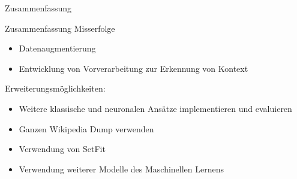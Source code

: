 \documentclass[aspectratio=169]{beamer} %
\begin{document}
\begin{frame}{Zusammenfassung}
    \begin{block}{Zusammenfassung}
        Misserfolge
        \begin{itemize}
            \item Datenaugmentierung
            \item Entwicklung von Vorverarbeitung zur Erkennung von Kontext
        \end{itemize}
        Erweiterungsmöglichkeiten:
        \begin{itemize}
            \item Weitere klassische und neuronalen Ansätze implementieren und evaluieren
            \item Ganzen Wikipedia Dump verwenden
            \item Verwendung von SetFit
            \item Verwendung weiterer Modelle des Maschinellen Lernens
        \end{itemize}
    \end{block}
\end{frame}

\appendix

\end{document}
